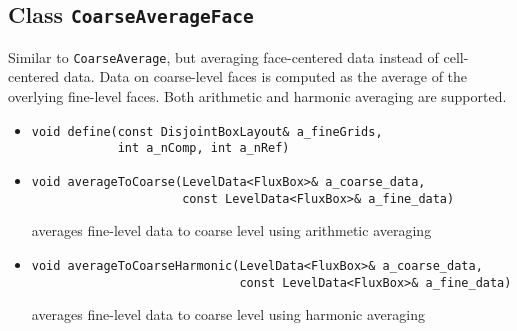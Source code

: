 \subsection{Class {\tt CoarseAverageFace}}
Similar to {\tt CoarseAverage}, but averaging face-centered data
instead of cell-centered data. Data on coarse-level faces is computed
as the average of the overlying fine-level faces. Both arithmetic and
harmonic averaging are supported. 
\begin{itemize}
\item
\begin{verbatim}
void define(const DisjointBoxLayout& a_fineGrids,
            int a_nComp, int a_nRef)
\end{verbatim}

\item
\begin{verbatim}
void averageToCoarse(LevelData<FluxBox>& a_coarse_data,
                     const LevelData<FluxBox>& a_fine_data)
\end{verbatim}
averages fine-level data to coarse level using arithmetic averaging

\item
\begin{verbatim}  
void averageToCoarseHarmonic(LevelData<FluxBox>& a_coarse_data,
                             const LevelData<FluxBox>& a_fine_data)
\end{verbatim}
averages fine-level data to coarse level using harmonic averaging

\end{itemize}
